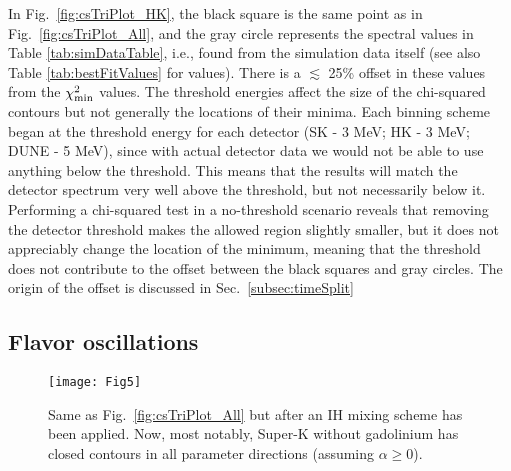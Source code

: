 \documentclass[aps,reprint,superscriptaddress]{revtex4-1}
\begin{document}
In Fig.~\ref{fig:csTriPlot_HK}, the black square is the same point as in Fig.~\ref{fig:csTriPlot_All}, and the gray circle  represents the spectral values in Table \ref{tab:simDataTable}, i.e., found from the simulation data itself (see also Table \ref{tab:bestFitValues} for values). There is a $\lesssim$ 25\% offset in these values from the $\chi^{2}_{\rm min}$ values.  The threshold energies affect the size of the chi-squared contours but not generally the locations of their minima. Each binning scheme began at the threshold energy for each detector (SK - 3 MeV; HK - 3 MeV; DUNE - 5 MeV), since with actual detector data we would not be able to use anything below the threshold. This means that the results will match the detector spectrum very well above the threshold, but not necessarily below it. Performing a chi-squared test in a no-threshold scenario reveals that removing the detector threshold makes the allowed region slightly smaller, but it does not appreciably change the location of the minimum, meaning that the threshold does not contribute to the offset between the black squares and gray circles.  The origin of the offset is discussed in Sec.~\ref{subsec:timeSplit}

\subsection{Flavor oscillations}

\begin{figure}[t]
\centering
\texttt{[image: Fig5]}
\caption{Same as Fig.~\ref{fig:csTriPlot_All} but after an IH mixing scheme has been applied. Now, most notably, Super-K without gadolinium has closed contours in all parameter directions (assuming $\alpha\geq0$).}
\label{fig:csTriPlot_All_IH}
\end{figure}
\end{document}
